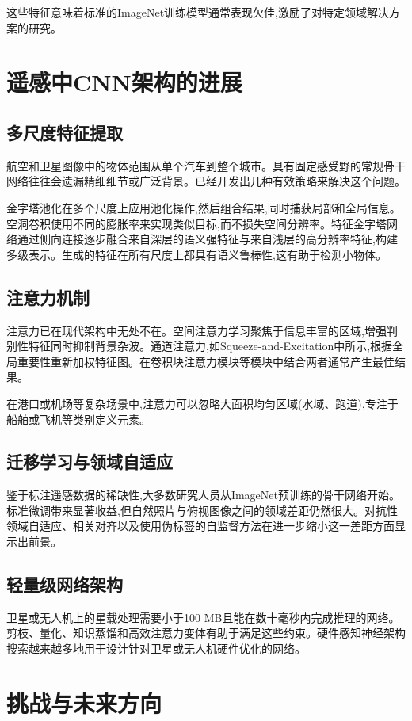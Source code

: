 \documentclass[12pt,a4paper]{article}
\begin{document}
这些特征意味着标准的ImageNet训练模型通常表现欠佳,激励了对特定领域解决方案的研究。

\section{遥感中CNN架构的进展}
\label{sec:developments}
\subsection{多尺度特征提取}
航空和卫星图像中的物体范围从单个汽车到整个城市。具有固定感受野的常规骨干网络往往会遗漏精细细节或广泛背景。已经开发出几种有效策略来解决这个问题。

金字塔池化在多个尺度上应用池化操作,然后组合结果,同时捕获局部和全局信息。空洞卷积使用不同的膨胀率来实现类似目标,而不损失空间分辨率。特征金字塔网络通过侧向连接逐步融合来自深层的语义强特征与来自浅层的高分辨率特征,构建多级表示。生成的特征在所有尺度上都具有语义鲁棒性,这有助于检测小物体。

\subsection{注意力机制}
注意力已在现代架构中无处不在。空间注意力学习聚焦于信息丰富的区域,增强判别性特征同时抑制背景杂波。通道注意力,如Squeeze-and-Excitation中所示,根据全局重要性重新加权特征图。在卷积块注意力模块等模块中结合两者通常产生最佳结果。

在港口或机场等复杂场景中,注意力可以忽略大面积均匀区域(水域、跑道),专注于船舶或飞机等类别定义元素。

\subsection{迁移学习与领域自适应}
鉴于标注遥感数据的稀缺性,大多数研究人员从ImageNet预训练的骨干网络开始。标准微调带来显著收益,但自然照片与俯视图像之间的领域差距仍然很大。对抗性领域自适应、相关对齐以及使用伪标签的自监督方法在进一步缩小这一差距方面显示出前景。

\subsection{轻量级网络架构}
卫星或无人机上的星载处理需要小于100 MB且能在数十毫秒内完成推理的网络。剪枝、量化、知识蒸馏和高效注意力变体有助于满足这些约束。硬件感知神经架构搜索越来越多地用于设计针对卫星或无人机硬件优化的网络。

\section{挑战与未来方向}
\label{sec:challenges}
\end{document}
